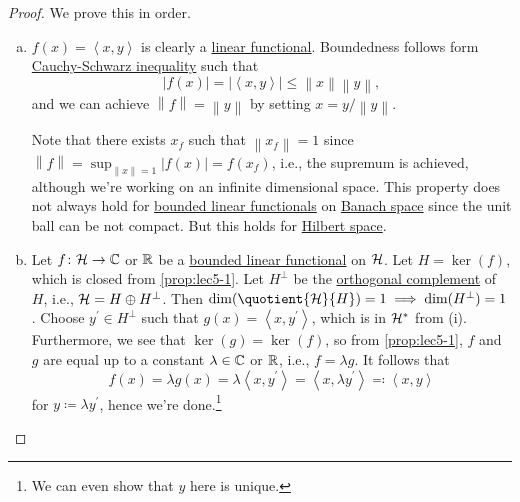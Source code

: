 \begin{proof}
	We prove this in order.
	\begin{enumerate}[(a)]
		\item \(f(x)= \left\langle x, y \right\rangle \) is clearly a \hyperref[def:linear-functional]{linear functional}. Boundedness follows form \hyperref[thm:Cauchy-Schwarz-ineq]{Cauchy-Schwarz inequality} such that
		      \[
			      \left\vert f(x) \right\vert = \left\vert \left\langle x, y \right\rangle  \right\vert \leq \left\lVert x\right\rVert \left\lVert y\right\rVert ,
		      \]
		      and we can achieve \(\left\lVert f\right\rVert = \left\lVert y\right\rVert \) by setting \(x = y / \left\lVert y\right\rVert \).
		      \begin{note}
			      Note that there exists \(x_f\) such that \(\left\lVert x_f\right\rVert = 1\) since \(\left\lVert f\right\rVert = \sup _{\left\lVert x\right\rVert = 1} \left\vert f(x) \right\vert = f(x_f)\), i.e., the supremum is achieved, although we're working on an infinite dimensional space. This property does not always hold for \hyperref[def:bounded-linear-functional]{bounded linear functionals} on \hyperref[def:Banach-space]{Banach space} since the unit ball can be not compact. But this holds for \hyperref[def:Hilbert-space]{Hilbert space}.
		      \end{note}
		\item Let \(f\colon \mathcal{\MakeUppercase{h}} \to \mathbb{\MakeUppercase{c}} \) or \(\mathbb{\MakeUppercase{r}} \) be a \hyperref[def:bounded-linear-functional]{bounded linear functional} on \(\mathcal{\MakeUppercase{h}} \). Let \(H = \ker(f)\), which is closed from \autoref{prop:lec5-1}. Let \(H ^\perp\) be the \hyperref[def:orthogonal-complement]{orthogonal complement} of \(H\), i.e., \(\mathcal{\MakeUppercase{h}} = H\oplus H^\perp\). Then \(\dim (\quotient{\mathcal{\MakeUppercase{h}} }{H} )= 1\implies \dim(H^\perp) = 1\). Choose \(y^\prime \in H^\perp\) such that \(g(x) = \left\langle x, y^\prime \right\rangle \), which is in \(\mathcal{\MakeUppercase{h}} ^{\ast} \) from (i). Furthermore, we see that \(\ker(g) = \ker(f)\), so from \autoref{prop:lec5-1}, \(f\) and \(g\) are equal up to a constant \(\lambda \in \mathbb{\MakeUppercase{c}} \) or \(\mathbb{\MakeUppercase{r}} \), i.e., \(f = \lambda g\). It follows that
		      \[
			      f(x) = \lambda g(x) = \lambda \left\langle x, y^\prime \right\rangle = \left\langle x, \lambda y^\prime \right\rangle \eqqcolon \left\langle x, y \right\rangle
		      \]
		      for \(y \coloneqq \lambda y^\prime \), hence we're done.\footnote{We can even show that \(y\) here is unique.}
	\end{enumerate}
\end{proof}

